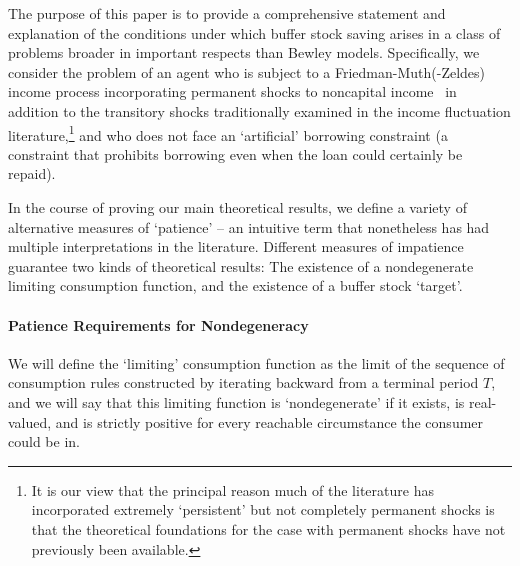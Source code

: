 \documentclass[BufferStockTheory]{subfiles}
\begin{document}
The purpose of this paper is to provide a comprehensive statement and explanation of the conditions under which buffer stock saving arises in a class of problems broader in important respects than Bewley models. Specifically, we consider the problem of an agent who is subject to a Friedman-Muth(-Zeldes) income process incorporating permanent shocks to noncapital income~\citep{friedmanATheory, muthOptimal, zeldesStochastic} in addition to the transitory shocks traditionally examined in the income fluctuation literature,\footnote{It is our view that the principal reason much of the literature has incorporated extremely `persistent' but not completely permanent shocks is that the theoretical foundations for the case with permanent shocks have not previously been available.}
and who does not face an `artificial' borrowing constraint (a constraint that prohibits borrowing even when the loan could certainly be repaid).

In the course of proving our main theoretical results, we define a variety of alternative measures of `patience' -- an intuitive term that nonetheless has had multiple interpretations in the literature. Different measures of impatience guarantee two kinds of theoretical results: The existence of a nondegenerate limiting consumption function, and the existence of a buffer stock `target'.

\paragraph{Patience Requirements for Nondegeneracy}
We will define the `limiting' consumption function as the limit of the sequence of consumption rules constructed by iterating backward from a terminal period $T$, and we will say that this limiting function is `nondegenerate' if it exists, is real-valued, and is strictly positive for every reachable circumstance the consumer could be in.


\end{document}
